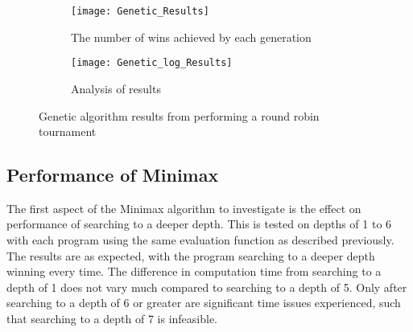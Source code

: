 \documentclass[12pt,a4paper]{article}
\begin{document}
%

\begin{figure}[ht]
\centering
\begin{subfigure}{.5\textwidth}
  \centering
  \texttt{[image: Genetic\_Results]}
  \caption{The number of wins achieved by each generation}
  \label{fig:genetic_raw}
\end{subfigure}%
\begin{subfigure}{.5\textwidth}
  \centering
  \texttt{[image: Genetic\_log\_Results]}
  \caption{Analysis of results}
  \label{fig:genetic_annotated}
\end{subfigure}
\caption{Genetic algorithm results from performing a round robin tournament}
\label{fig:genetic_results}
\end{figure}

\subsection{Performance of Minimax}

The first aspect of the Minimax algorithm to investigate is the effect on performance of searching to a deeper depth. This is tested on depths of 1 to 6 with each program using the same evaluation function as described previously. The results are as expected, with the program searching to a deeper depth winning every time. The difference in computation time from searching to a depth of 1 does not vary much compared to searching to a depth of 5. Only after searching to a depth of 6 or greater are significant time issues experienced, such that searching to a depth of 7 is infeasible.
\end{document}
